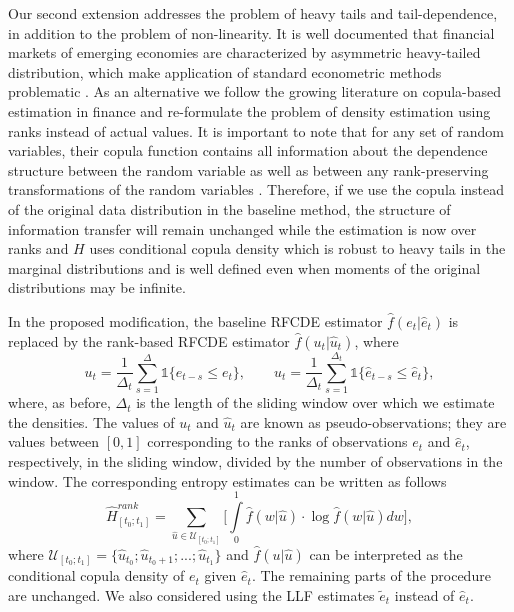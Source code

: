 Our second extension addresses the problem of heavy tails and tail-dependence, in addition to the problem of non-linearity. It is well documented that financial markets of emerging economies are characterized by asymmetric heavy-tailed distribution, which make application of standard econometric methods problematic \cite[see, e.g.,][]{Chen/ibra:19}. As an alternative we follow the growing literature on copula-based estimation in finance \cite[see, e.g.,][]{Ibragimov/prokhorov:17} and re-formulate the problem of density estimation using ranks instead of actual values. It is important to note that for any set of random variables, their copula function contains all information about the dependence structure between the random variable as well as between any rank-preserving transformations of the random variables \cite[see, e.g.,][for a survey of copula methods in finance]{cherubini/etal:11}.  Therefore, if we use the copula instead of the original data distribution in the baseline method, the structure of information transfer will remain unchanged while the estimation is now over ranks and $H$ uses conditional copula density which is robust to heavy tails in the marginal distributions and is well defined even when moments of the original distributions may be infinite. 

In the proposed modification, the baseline RFCDE estimator $\hat{f}(e_t|\hat{e}_t)$ is replaced by the rank-based RFCDE estimator $\hat{f}(u_t|\hat{u}_t)$, where 
\begin{equation*}
    u_{t} = \dfrac{1}{\Delta_t} \sum\limits_{s=1}^{\Delta} \mathds{1}\{e_{t-s} \leq e_t \}, \qquad \hat{u}_{t} = \dfrac{1}{\Delta_t} \sum\limits_{s=1}^{\Delta_t} \mathds{1}\{\hat{e}_{t-s} \leq \hat{e}_t \},
\end{equation*}
where, as before, $\Delta_t$ is the length of the sliding window over which we estimate the densities. The values of $u_t$ and $\hat{u}_t$ are known as pseudo-observations; they are values between $[0,1]$ corresponding to the ranks of observations $e_t$ and $\hat{e}_t$, respectively, in the sliding window, divided by the number of observations in the window.
The corresponding entropy estimates can be written as follows
\begin{equation}\label{eq:H_ranks}
    \hat{H}_{[t_0;t_1]}^{rank} = \sum\limits_{{\hat{u}} \in \mathcal{U}_{[t_0; t_1]}} \bigg[\int\limits_{0}^{1} \hat{f}(w |{\hat{u}}) \cdot \log \hat{f}(w |{\hat{u}}) dw\bigg],
\end{equation}
where $\mathcal{U}_{[t_0; t_1]} = \{\hat{u}_{t_0}; {\hat{u}}_{t_0+1}; ...; {\hat{u}}_{t_1} \}$ and  $\hat{f}(u |{\hat{u}})$ can be interpreted as the conditional copula density of $e_t$ given $\hat{e}_t$.
The remaining parts of the procedure are unchanged. We also considered using the LLF estimates $\tilde{e}_t$ instead of $\hat{e}_t$.

